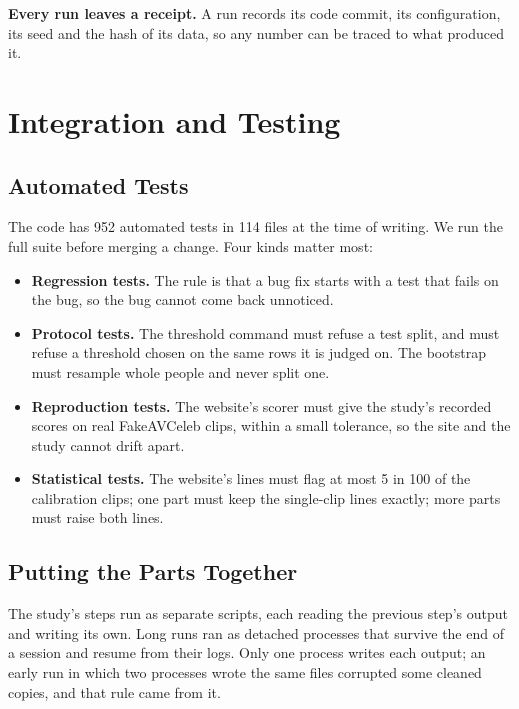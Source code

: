 \textbf{Every run leaves a receipt.} A run records its code commit, its
configuration, its seed and the hash of its data, so any number can be traced
to what produced it.

\section{Integration and Testing}
\label{sec:m-testing}

\subsection{Automated Tests}

The code has 952 automated tests in 114 files at the time of writing. We run
the full suite before merging a change. Four kinds matter most:

\begin{itemize}
    \item \textbf{Regression tests.} The rule is that a bug fix starts with a
    test that fails on the bug, so the bug cannot come back unnoticed.
    \item \textbf{Protocol tests.} The threshold command must refuse a test
    split, and must refuse a threshold chosen on the same rows it is judged
    on. The bootstrap must resample whole people and never split one.
    \item \textbf{Reproduction tests.} The website's scorer must give the
    study's recorded scores on real FakeAVCeleb clips, within a small
    tolerance, so the site and the study cannot drift apart.
    \item \textbf{Statistical tests.} The website's lines must flag at most 5
    in 100 of the calibration clips; one part must keep the single-clip lines
    exactly; more parts must raise both lines.
\end{itemize}

\subsection{Putting the Parts Together}

The study's steps run as separate scripts, each reading the previous step's
output and writing its own. Long runs ran as detached processes that survive
the end of a session and resume from their logs. Only one process writes each
output; an early run in which two processes wrote the same files corrupted
some cleaned copies, and that rule came from it.

